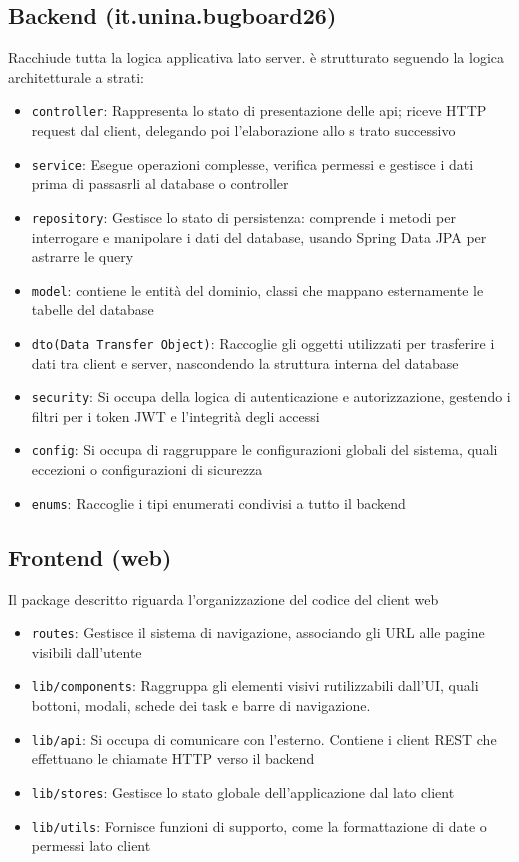 \subsection{Backend (it.unina.bugboard26)}
Racchiude tutta la logica applicativa lato server. è strutturato seguendo la logica architetturale a strati:
\begin{itemize}
    \item \texttt{controller}: Rappresenta lo stato di presentazione delle api; riceve HTTP request dal client, delegando poi l'elaborazione allo s  trato successivo
    \item \texttt{service}: Esegue operazioni complesse, verifica permessi e gestisce i dati prima di passasrli al database o controller
    \item \texttt{repository}: Gestisce lo stato di persistenza: comprende i metodi per interrogare e manipolare i dati del database, usando Spring Data JPA per astrarre le query
    \item \texttt{model}: contiene le entità del dominio, classi che mappano esternamente le tabelle del database
    \item \texttt{dto(Data Transfer Object)}: Raccoglie gli oggetti utilizzati per trasferire i dati tra client e server, nascondendo la struttura interna del database 
    \item \texttt{security}: Si occupa della logica di autenticazione e autorizzazione, gestendo i filtri per i token JWT e l'integrità degli accessi
    \item \texttt{config}: Si occupa di raggruppare le configurazioni globali del sistema, quali eccezioni o configurazioni di sicurezza
    \item \texttt{enums}: Raccoglie i tipi enumerati condivisi a tutto il backend
\end{itemize}

\subsection{Frontend (web)}
Il package descritto riguarda l'organizzazione del codice del client web
\begin{itemize}
    \item \texttt{routes}: Gestisce il sistema di navigazione, associando gli URL alle pagine visibili dall'utente
    \item \texttt{lib/components}: Raggruppa gli elementi visivi rutilizzabili dall'UI, quali bottoni, modali, schede dei task e barre di navigazione.
    \item \texttt{lib/api}: Si occupa di comunicare con l'esterno. Contiene i client REST che effettuano le chiamate HTTP verso il backend
    \item \texttt{lib/stores}: Gestisce lo stato globale dell'applicazione dal lato client
    \item \texttt{lib/utils}: Fornisce funzioni di supporto, come la formattazione di date o permessi lato client
\end{itemize}

